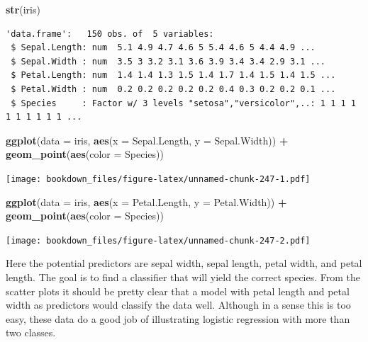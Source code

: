 \documentclass[
]{krantz}
\makeatletter
\newenvironment{Shaded}{\begin{snugshade}}{\end{snugshade}}
\newcommand{\DataTypeTok}[1]{\textcolor[rgb]{0.27,0.27,0.27}{#1}}
\newcommand{\KeywordTok}[1]{\textcolor[rgb]{0.27,0.27,0.27}{\textbf{#1}}}
\newcommand{\NormalTok}[1]{#1}
\newcommand{\OperatorTok}[1]{\textcolor[rgb]{0.43,0.43,0.43}{\textbf{#1}}}
\newcommand{\StringTok}[1]{\textcolor[rgb]{0.5,0.5,0.5}{#1}}
\newenvironment{kframe}{%
\medskip{}
\setlength{\fboxsep}{.8em}
 \def\at@end@of@kframe{}%
 \ifinner\ifhmode%
  \def\at@end@of@kframe{\end{minipage}}%
  \begin{minipage}{\columnwidth}%
 \fi\fi%
 \def\FrameCommand##1{\hskip\@totalleftmargin \hskip-\fboxsep
 \colorbox{shadecolor}{##1}\hskip-\fboxsep
     \hskip-\linewidth \hskip-\@totalleftmargin \hskip\columnwidth}%
 \MakeFramed {\advance\hsize-\width
   \@totalleftmargin\z@ \linewidth\hsize
   \@setminipage}}%
 {\par\unskip\endMakeFramed%
 \at@end@of@kframe}
\renewenvironment{Shaded}{\begin{kframe}}{\end{kframe}}
\makeatother
\begin{document}
\begin{Shaded}
\begin{Highlighting}[]
\KeywordTok{str}\NormalTok{(iris)}
\end{Highlighting}
\end{Shaded}

\begin{verbatim}
'data.frame':	150 obs. of  5 variables:
 $ Sepal.Length: num  5.1 4.9 4.7 4.6 5 5.4 4.6 5 4.4 4.9 ...
 $ Sepal.Width : num  3.5 3 3.2 3.1 3.6 3.9 3.4 3.4 2.9 3.1 ...
 $ Petal.Length: num  1.4 1.4 1.3 1.5 1.4 1.7 1.4 1.5 1.4 1.5 ...
 $ Petal.Width : num  0.2 0.2 0.2 0.2 0.2 0.4 0.3 0.2 0.2 0.1 ...
 $ Species     : Factor w/ 3 levels "setosa","versicolor",..: 1 1 1 1 1 1 1 1 1 1 ...
\end{verbatim}

\begin{Shaded}
\begin{Highlighting}[]
\KeywordTok{ggplot}\NormalTok{(}\DataTypeTok{data =}\NormalTok{ iris, }\KeywordTok{aes}\NormalTok{(}\DataTypeTok{x =}\NormalTok{ Sepal.Length, }\DataTypeTok{y =}\NormalTok{ Sepal.Width)) }\OperatorTok{+}\StringTok{ }
\StringTok{  }\KeywordTok{geom\_point}\NormalTok{(}\KeywordTok{aes}\NormalTok{(}\DataTypeTok{color =}\NormalTok{ Species))}
\end{Highlighting}
\end{Shaded}

\texttt{[image: bookdown\_files/figure-latex/unnamed-chunk-247-1.pdf]}

\begin{Shaded}
\begin{Highlighting}[]
\KeywordTok{ggplot}\NormalTok{(}\DataTypeTok{data =}\NormalTok{ iris, }\KeywordTok{aes}\NormalTok{(}\DataTypeTok{x =}\NormalTok{ Petal.Length, }\DataTypeTok{y =}\NormalTok{ Petal.Width)) }\OperatorTok{+}\StringTok{ }
\StringTok{  }\KeywordTok{geom\_point}\NormalTok{(}\KeywordTok{aes}\NormalTok{(}\DataTypeTok{color =}\NormalTok{ Species))}
\end{Highlighting}
\end{Shaded}

\texttt{[image: bookdown\_files/figure-latex/unnamed-chunk-247-2.pdf]}

Here the potential predictors are sepal width, sepal length, petal width, and petal length. The goal is to find a classifier that will yield the correct species. From the scatter plots it should be pretty clear that a model with petal length and petal width as predictors would classify the data well. Although in a sense this is too easy, these data do a good job of illustrating logistic regression with more than two classes.
\end{document}
